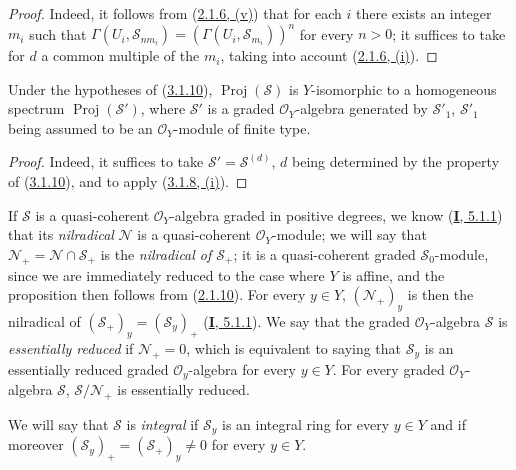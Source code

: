\begin{proof}
Indeed, it follows from (\hyperref[II.2.1.6]{2.1.6, (v)}) that for each
$i$ there exists an integer $m_i$ such that
$\Gamma(U_i,\mathcal{S}_{nm_i})=(\Gamma(U_i,\mathcal{S}_{m_i}))^n$ for every
$n>0$; it suffices to take for $d$ a common multiple of the $m_i$, taking
into account (\hyperref[II.2.1.6]{2.1.6, (i)}).
\end{proof}

\begin{corollary}[3.1.11]
\label{II.3.1.11}
Under the hypotheses of \textup{(\hyperref[II.3.1.10]{3.1.10})},
$\operatorname{Proj}(\mathcal{S})$ is $Y$-isomorphic to a homogeneous spectrum
$\operatorname{Proj}(\mathcal{S}')$, where $\mathcal{S}'$ is a graded
$\mathcal{O}_Y$-algebra generated by $\mathcal{S}'_1$,
$\mathcal{S}'_1$ being assumed to be an $\mathcal{O}_Y$-module of finite type.
\end{corollary}

\begin{proof}
Indeed, it suffices to take $\mathcal{S}'=\mathcal{S}^{(d)}$, $d$ being
determined by the property of (\hyperref[II.3.1.10]{3.1.10}), and to
apply (\hyperref[II.3.1.8]{3.1.8, (i)}).
\end{proof}

\begin{env}[3.1.12]
\label{II.3.1.12}
If $\mathcal{S}$ is a quasi-coherent $\mathcal{O}_Y$-algebra graded in
positive degrees, we know (\hyperref[I.5.1.1]{\textbf{I}, 5.1.1}) that its
\emph{nilradical} $\mathcal{N}$ is a quasi-coherent $\mathcal{O}_Y$-module;
we will say that $\mathcal{N}_+=\mathcal{N}\cap\mathcal{S}_+$ is the
\emph{nilradical of $\mathcal{S}_+$}; it is a quasi-coherent graded
$\mathcal{S}_0$-module, since we are immediately reduced to the case where
$Y$ is affine, and the proposition then follows from
(\hyperref[II.2.1.10]{2.1.10}). For every $y\in Y$,
$(\mathcal{N}_+)_y$ is then the nilradical of
$(\mathcal{S}_+)_y=(\mathcal{S}_y)_+$
(\hyperref[I.5.1.1]{\textbf{I}, 5.1.1}). We say that the graded
$\mathcal{O}_Y$-algebra $\mathcal{S}$ is \emph{essentially reduced} if
$\mathcal{N}_+=0$, which is equivalent
to saying that $\mathcal{S}_y$ is an essentially reduced graded
$\mathcal{O}_y$-algebra for every $y\in Y$. For every graded
$\mathcal{O}_Y$-algebra $\mathcal{S}$, $\mathcal{S}/\mathcal{N}_+$ is
essentially reduced.

We will say that $\mathcal{S}$ is \emph{integral} if $\mathcal{S}_y$ is an
integral ring for every $y\in Y$ and if moreover
$(\mathcal{S}_y)_+=(\mathcal{S}_+)_y\neq0$ for every $y\in Y$.
\end{env}

